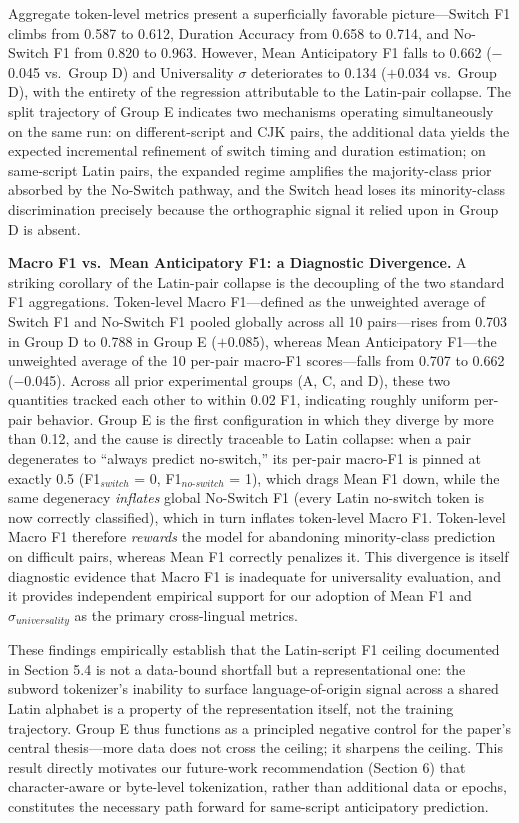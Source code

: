 \documentclass[sigconf,nonacm]{acmart}
\begin{document}
Aggregate token-level metrics present a superficially favorable picture---Switch F1 climbs from 0.587 to 0.612, Duration Accuracy from 0.658 to 0.714, and No-Switch F1 from 0.820 to 0.963. However, Mean Anticipatory F1 falls to 0.662 ($-$0.045 vs.\ Group D) and Universality $\sigma$ deteriorates to 0.134 ($+$0.034 vs.\ Group D), with the entirety of the regression attributable to the Latin-pair collapse. The split trajectory of Group E indicates two mechanisms operating simultaneously on the same run: on different-script and CJK pairs, the additional data yields the expected incremental refinement of switch timing and duration estimation; on same-script Latin pairs, the expanded regime amplifies the majority-class prior absorbed by the No-Switch pathway, and the Switch head loses its minority-class discrimination precisely because the orthographic signal it relied upon in Group D is absent.

\textbf{Macro F1 vs.\ Mean Anticipatory F1: a Diagnostic Divergence.} A striking corollary of the Latin-pair collapse is the decoupling of the two standard F1 aggregations. Token-level Macro F1---defined as the unweighted average of Switch F1 and No-Switch F1 pooled globally across all 10 pairs---rises from 0.703 in Group D to 0.788 in Group E ($+$0.085), whereas Mean Anticipatory F1---the unweighted average of the 10 per-pair macro-F1 scores---falls from 0.707 to 0.662 ($-$0.045). Across all prior experimental groups (A, C, and D), these two quantities tracked each other to within 0.02 F1, indicating roughly uniform per-pair behavior. Group E is the first configuration in which they diverge by more than 0.12, and the cause is directly traceable to Latin collapse: when a pair degenerates to ``always predict no-switch,'' its per-pair macro-F1 is pinned at exactly 0.5 (F1$_{switch}$ = 0, F1$_{no\text{-}switch}$ = 1), which drags Mean F1 down, while the same degeneracy \textit{inflates} global No-Switch F1 (every Latin no-switch token is now correctly classified), which in turn inflates token-level Macro F1. Token-level Macro F1 therefore \textit{rewards} the model for abandoning minority-class prediction on difficult pairs, whereas Mean F1 correctly penalizes it. This divergence is itself diagnostic evidence that Macro F1 is inadequate for universality evaluation, and it provides independent empirical support for our adoption of Mean F1 and $\sigma_{universality}$ as the primary cross-lingual metrics.

These findings empirically establish that the Latin-script F1 ceiling documented in Section 5.4 is not a data-bound shortfall but a representational one: the subword tokenizer's inability to surface language-of-origin signal across a shared Latin alphabet is a property of the representation itself, not the training trajectory. Group E thus functions as a principled negative control for the paper's central thesis---more data does not cross the ceiling; it sharpens the ceiling. This result directly motivates our future-work recommendation (Section 6) that character-aware or byte-level tokenization, rather than additional data or epochs, constitutes the necessary path forward for same-script anticipatory prediction.
\end{document}
